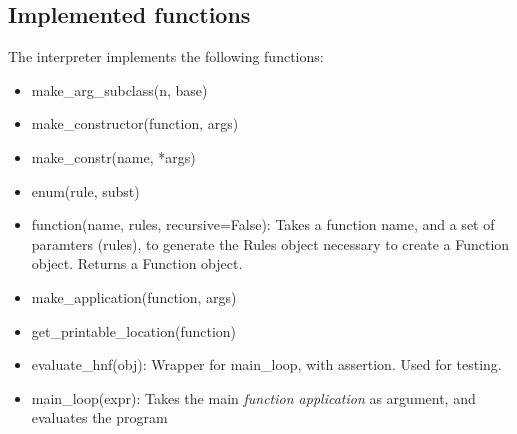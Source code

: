 \subsection{Implemented functions}

The interpreter implements the following functions:

\begin{itemize}

\item make\_arg\_subclass(n, base)
\item make\_constructor(function, args)
\item make\_constr(name, *args)
\item enum(rule, subst)
\item function(name, rules, recursive=False): Takes a function name, and a set of paramters (rules), to generate the Rules object necessary to create a Function object. Returns a Function object.
\item make\_application(function, args)
\item get\_printable\_location(function)
\item evaluate\_hnf(obj): Wrapper for main\_loop, with assertion. Used for testing.
\item main\_loop(expr): Takes the main \emph{function application} as argument, and evaluates
the program

\end{itemize}


